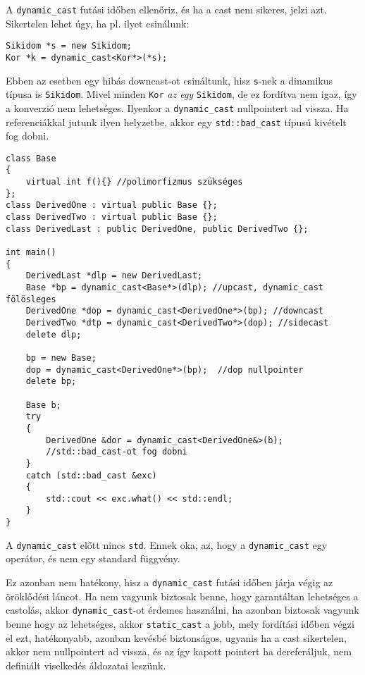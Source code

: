 \documentclass[a4paper,11.5pt,table]{article}
\begin{document}
	A \texttt{dynamic\_cast} futási időben ellenőriz, és ha a cast nem sikeres, jelzi azt. Sikertelen lehet úgy, ha pl. ilyet csinálunk:
	\begin{lstlisting}
Sikidom *s = new Sikidom;
Kor *k = dynamic_cast<Kor*>(*s);
	\end{lstlisting}
	Ebben az esetben egy hibás downcast-ot csináltunk, hisz \texttt{s}-nek a dinamikus típusa is \texttt{Sikidom}. Mivel minden \texttt{Kor} \textit{az egy} \texttt{Sikidom}, de ez fordítva nem igaz, így a konverzió nem lehetséges. Ilyenkor a \texttt{dynamic\_cast} nullpointert ad vissza. Ha referenciákkal jutunk ilyen helyzetbe, akkor egy \texttt{std::bad\_cast} típusú kivételt fog dobni.
	\begin{lstlisting}
class Base 
{
	virtual int f(){} //polimorfizmus szükséges
};
class DerivedOne : virtual public Base {};
class DerivedTwo : virtual public Base {};
class DerivedLast : public DerivedOne, public DerivedTwo {};

int main()
{
	DerivedLast *dlp = new DerivedLast;
	Base *bp = dynamic_cast<Base*>(dlp); //upcast, dynamic_cast fölösleges
	DerivedOne *dop = dynamic_cast<DerivedOne*>(bp); //downcast
	DerivedTwo *dtp = dynamic_cast<DerivedTwo*>(dop); //sidecast
	delete dlp;
	
	bp = new Base;
	dop = dynamic_cast<DerivedOne*>(bp);  //dop nullpointer
	delete bp;
	
	Base b;
	try
	{
		DerivedOne &dor = dynamic_cast<DerivedOne&>(b); 
		//std::bad_cast-ot fog dobni
	}
	catch (std::bad_cast &exc)
	{
		std::cout << exc.what() << std::endl;
	}
}
	\end{lstlisting}	
	\begin{note}
		A \texttt{dynamic\_cast} előtt nincs \texttt{std}. Ennek oka, az, hogy a \texttt{dynamic\_cast} egy operátor, és nem egy standard függvény.
	\end{note}
	
	Ez azonban nem hatékony, hisz a \texttt{dynamic\_cast} futási időben járja végig az öröklődési láncot. Ha nem vagyunk biztosak benne, hogy garantáltan lehetséges a castolás, akkor \texttt{dynamic\_cast}-ot érdemes használni, ha azonban biztosak vagyunk benne hogy az lehetséges, akkor \texttt{static\_cast} a jobb, mely fordítási időben végzi el ezt, hatékonyabb, azonban kevésbé biztonságos, ugyanis ha a cast sikertelen, akkor nem nullpointert ad vissza, és az így kapott pointert ha dereferáljuk, nem definiált viselkedés áldozatai leszünk.
\end{document}
